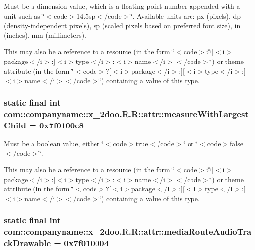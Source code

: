 Must be a dimension value, which is a floating point number appended with a unit such as \char`\"{}$<$code$>$14.5sp$<$/code$>$\char`\"{}. Available units are: px (pixels), dp (density-independent pixels), sp (scaled pixels based on preferred font size), in (inches), mm (millimeters). 

This may also be a reference to a resource (in the form \char`\"{}$<$code$>$@\mbox{[}$<$i$>$package$<$/i$>$:\mbox{]}$<$i$>$type$<$/i$>$:$<$i$>$name$<$/i$>$$<$/code$>$\char`\"{}) or theme attribute (in the form \char`\"{}$<$code$>$?\mbox{[}$<$i$>$package$<$/i$>$:\mbox{]}\mbox{[}$<$i$>$type$<$/i$>$:\mbox{]}$<$i$>$name$<$/i$>$$<$/code$>$\char`\"{}) containing a value of this type. \hypertarget{classcom_1_1companyname_1_1x__2doo_1_1_r_1_1attr_88219244ae2e88fca8cec2889d3c7a79}{
\subsubsection[{measureWithLargestChild}]{\setlength{\rightskip}{0pt plus 5cm}static final int com::companyname::x\_\-2doo.R.R::attr::measureWithLargestChild = 0x7f0100c8}}
\label{classcom_1_1companyname_1_1x__2doo_1_1_r_1_1attr_88219244ae2e88fca8cec2889d3c7a79}


Must be a boolean value, either \char`\"{}$<$code$>$true$<$/code$>$\char`\"{} or \char`\"{}$<$code$>$false$<$/code$>$\char`\"{}. 

This may also be a reference to a resource (in the form \char`\"{}$<$code$>$@\mbox{[}$<$i$>$package$<$/i$>$:\mbox{]}$<$i$>$type$<$/i$>$:$<$i$>$name$<$/i$>$$<$/code$>$\char`\"{}) or theme attribute (in the form \char`\"{}$<$code$>$?\mbox{[}$<$i$>$package$<$/i$>$:\mbox{]}\mbox{[}$<$i$>$type$<$/i$>$:\mbox{]}$<$i$>$name$<$/i$>$$<$/code$>$\char`\"{}) containing a value of this type. \hypertarget{classcom_1_1companyname_1_1x__2doo_1_1_r_1_1attr_ab37f0c9b50e0ecae578a990d107c873}{
\subsubsection[{mediaRouteAudioTrackDrawable}]{\setlength{\rightskip}{0pt plus 5cm}static final int com::companyname::x\_\-2doo.R.R::attr::mediaRouteAudioTrackDrawable = 0x7f010004}}
\label{classcom_1_1companyname_1_1x__2doo_1_1_r_1_1attr_ab37f0c9b50e0ecae578a990d107c873}


